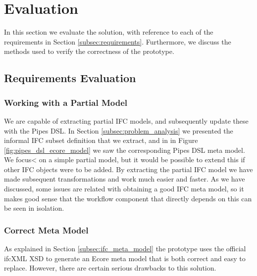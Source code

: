 \section{Evaluation}
\label{sec:evaluation}
In this section we evaluate the solution, with reference to each of the requirements in Section \ref{subsec:requirements}. Furthermore, we discuss the methods used to verify the correctness of the prototype.


\subsection{Requirements Evaluation}
\label{subsec:requirements_evaluation}
\subsubsection{Working with a Partial Model}
We are capable of extracting partial IFC models, and subsequently update these with the Pipes DSL. In Section \ref{subsec:problem_analysis} we presented the informal IFC subset definition that we extract, and in in Figure \ref{fig:pipes_dsl_ecore_model} we saw the corresponding Pipes DSL meta model. We focus< on a simple partial model, but it would be possible to extend this if other IFC objects were to be added. By extracting the partial IFC model we have made subsequent transformations and work much easier and faster. As we have discussed, some issues are related with obtaining a good IFC meta model, so it makes good sense that the workflow component that directly depends on this can be seen in isolation.

\subsubsection{Correct Meta Model} As explained in Section \ref{subsec:ifc_meta_model} the prototype uses the official ifcXML XSD to generate an Ecore meta model that is both correct and easy to replace. However, there are certain serious drawbacks to this solution.

